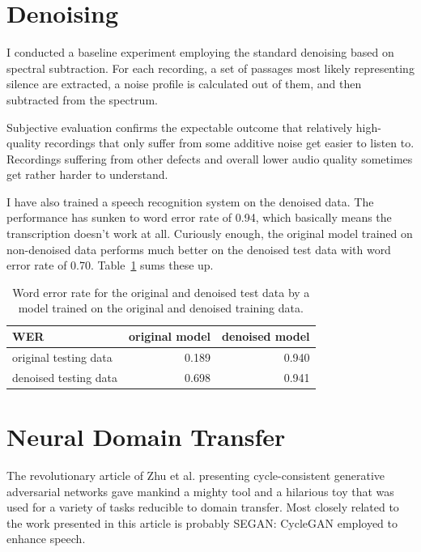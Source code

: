 \documentclass[hidelinks,12pt,a4paper]{report}
\begin{document}
\section{Denoising}

I conducted a baseline experiment employing the standard denoising based on
spectral subtraction. For each recording, a set of passages most likely
representing silence are extracted, a noise profile is calculated out of them,
and then subtracted from the spectrum.

Subjective evaluation confirms the expectable outcome that relatively
high-quality recordings that only suffer from some additive noise get
easier to listen to. Recordings suffering from other defects and overall lower
audio quality sometimes get rather harder to understand.

I have also trained a speech recognition system on the denoised data. The
performance has sunken to word error rate of 0.94, which basically means the
transcription doesn't work at all. Curiously enough, the
original model trained on non-denoised data performs much better on the denoised
test data with word error rate of 0.70. Table~\ref{tab:results-denoise} sums
these up.

\begin{table}[htpb]
\caption{Word error rate for the original and denoised test data by a model trained
on the original and denoised training data.}\label{tab:results-denoise}
\centering
\begin{tabular}{|l||r|r|}
\hline
WER    & original model & denoised model \\
\hline
original testing data & 0.189 & 0.940 \\
denoised testing data & 0.698 & 0.941 \\
\hline
\end{tabular}
\end{table}

\section{Neural Domain Transfer}

The revolutionary article of Zhu et al.\cite{cyclegan} presenting
cycle-consistent generative adversarial networks gave mankind a mighty tool and
a hilarious toy that was used for a variety of tasks reducible to
domain transfer.
Most closely related to the work presented in this article is probably
SEGAN\cite{pascual2017segan}: CycleGAN employed to enhance speech.
\end{document}
